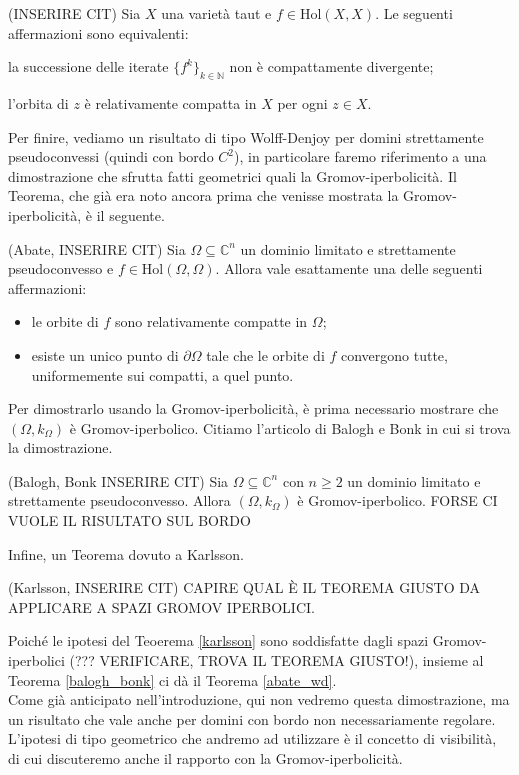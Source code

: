 \begin{thm}
    (INSERIRE CIT) Sia $X$ una varietà taut e $f \in \text{Hol}(X,X)$. Le seguenti affermazioni sono equivalenti:
    \begin{nlist}
        \item la successione delle iterate $\{f^k\}_{k \in \mathbb{N}}$ non è compattamente divergente;
        \item l'orbita di $z$ è relativamente compatta in $X$ per ogni $z \in X$.
    \end{nlist}
\end{thm}

Per finire, vediamo un risultato di tipo Wolff-Denjoy per domini strettamente pseudoconvessi (quindi con bordo $C^2$), in particolare faremo riferimento a una dimostrazione che sfrutta fatti geometrici quali la Gromov-iperbolicità. Il Teorema, che già era noto ancora prima che venisse mostrata la Gromov-iperbolicità, è il seguente.

\begin{thm} \label{abate_wd}
    (Abate, INSERIRE CIT) Sia $\Omega \subseteq \mathbb{C}^n$ un dominio limitato e strettamente pseudoconvesso e $f \in \text{Hol}(\Omega,\Omega)$. Allora vale esattamente una delle seguenti affermazioni:
    \begin{itemize}
        \item le orbite di $f$ sono relativamente compatte in $\Omega$;
        \item esiste un unico punto di $\partial\Omega$ tale che le orbite di $f$ convergono tutte, uniformemente sui compatti, a quel punto.
    \end{itemize}
\end{thm}

Per dimostrarlo usando la Gromov-iperbolicità, è prima necessario mostrare che $(\Omega,k_{\Omega})$ è Gromov-iperbolico. Citiamo l'articolo di Balogh e Bonk in cui si trova la dimostrazione.

\begin{thm} \label{balogh_bonk}
    (Balogh, Bonk INSERIRE CIT) Sia $\Omega \subseteq \mathbb{C}^n$ con $n \ge 2$ un dominio limitato e strettamente pseudoconvesso. Allora $(\Omega,k_{\Omega})$ è Gromov-iperbolico. FORSE CI VUOLE IL RISULTATO SUL BORDO
\end{thm}

Infine, un Teorema dovuto a Karlsson.

\begin{thm} \label{karlsson}
    (Karlsson, INSERIRE CIT) CAPIRE QUAL È IL TEOREMA GIUSTO DA APPLICARE A SPAZI GROMOV IPERBOLICI.
\end{thm}

Poiché le ipotesi del Teoerema \ref{karlsson} sono soddisfatte dagli spazi Gromov-iperbolici (??? VERIFICARE, TROVA IL TEOREMA GIUSTO!), insieme al Teorema \ref{balogh_bonk} ci dà il Teorema \ref{abate_wd}. \\

Come già anticipato nell'introduzione, qui non vedremo questa dimostrazione, ma un risultato che vale anche per domini con bordo non necessariamente regolare. L'ipotesi di tipo geometrico che andremo ad utilizzare è il concetto di visibilità, di cui discuteremo anche il rapporto con la Gromov-iperbolicità.